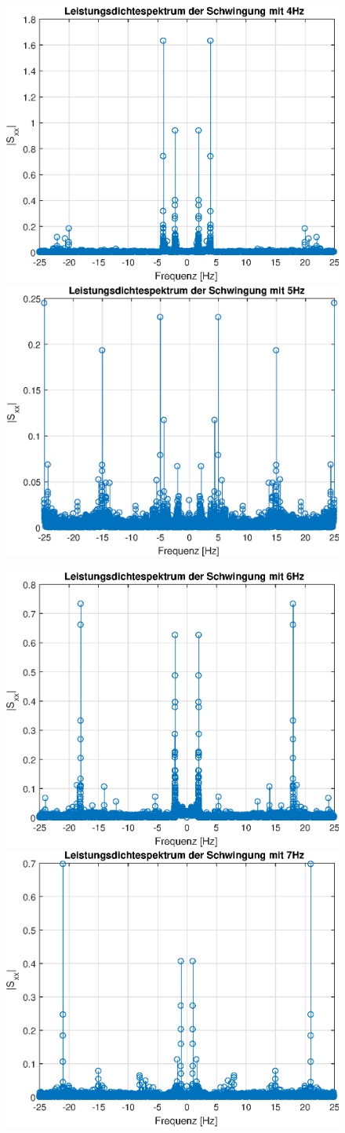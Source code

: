 \documentclass{article}
\begin{document}
\begin{figure}[h!]
\includegraphics[width=0.5\linewidth]{img/lds_sinefreq_4}
\includegraphics[width=0.5\linewidth]{img/lds_sinefreq_5}
\end{figure}
\newpage
\begin{figure}[h!]
\includegraphics[width=0.5\linewidth]{img/lds_sinefreq_6}
\includegraphics[width=0.5\linewidth]{img/lds_sinefreq_7}
\end{figure}
\end{document}

